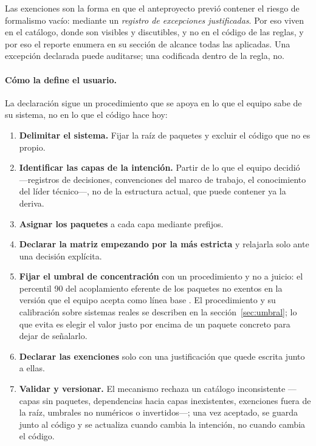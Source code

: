 Las exenciones son la forma en que el anteproyecto previó contener el riesgo de formalismo vacío: mediante un \textit{registro de excepciones justificadas}. Por eso viven en el catálogo, donde son visibles y discutibles, y no en el código de las reglas, y por eso el reporte enumera en su sección de alcance todas las aplicadas. Una excepción declarada puede auditarse; una codificada dentro de la regla, no.

\paragraph{Cómo la define el usuario.} La declaración sigue un procedimiento que se apoya en lo que el equipo sabe de su sistema, no en lo que el código hace hoy:

\begin{enumerate}
    \item \textbf{Delimitar el sistema.} Fijar la raíz de paquetes y excluir el código que no es propio.
    \item \textbf{Identificar las capas de la intención.} Partir de lo que el equipo decidió ---registros de decisiones, convenciones del marco de trabajo, el conocimiento del líder técnico---, no de la estructura actual, que puede contener ya la deriva.
    \item \textbf{Asignar los paquetes} a cada capa mediante prefijos.
    \item \textbf{Declarar la matriz empezando por la más estricta} y relajarla solo ante una decisión explícita.
    \item \textbf{Fijar el umbral de concentración} con un procedimiento y no a juicio: el percentil 90 del acoplamiento eferente de los paquetes no exentos en la versión que el equipo acepta como línea base \citep{Alves2010}. El procedimiento y su calibración sobre sistemas reales se describen en la sección~\ref{sec:umbral}; lo que evita es elegir el valor justo por encima de un paquete concreto para dejar de señalarlo.
    \item \textbf{Declarar las exenciones} solo con una justificación que quede escrita junto a ellas.
    \item \textbf{Validar y versionar.} El mecanismo rechaza un catálogo inconsistente ---capas sin paquetes, dependencias hacia capas inexistentes, exenciones fuera de la raíz, umbrales no numéricos o invertidos---; una vez aceptado, se guarda junto al código y se actualiza cuando cambia la intención, no cuando cambia el código.
\end{enumerate}

